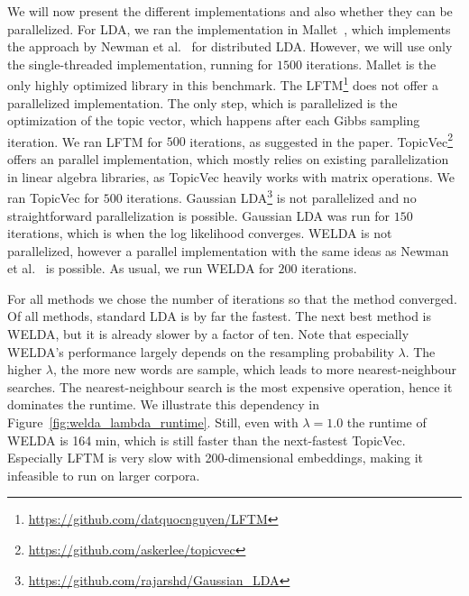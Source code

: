 \documentclass[
        a4paper,
        titlepage,
        twoside,
        parskip,
        numbers=noenddot
        ]{scrbook}
\theoremstyle{break}
\begin{document}
We will now present the different implementations and also whether they can be parallelized.
For LDA, we ran the implementation in Mallet~\cite{McCallum2002}, which implements the approach by Newman et al.~\cite{Newman2009} for distributed LDA.
However, we will use only the single-threaded implementation, running for $1500$ iterations.
Mallet is the only highly optimized library in this benchmark.
The LFTM\footnote{\url{https://github.com/datquocnguyen/LFTM}} does not offer a parallelized implementation.
The only step, which is parallelized is the optimization of the topic vector, which happens after each Gibbs sampling iteration.
We ran LFTM for $500$ iterations, as suggested in the paper.
TopicVec\footnote{\url{https://github.com/askerlee/topicvec}} offers an parallel implementation, which mostly relies on existing parallelization in linear algebra libraries, as TopicVec heavily works with matrix operations.
We ran TopicVec for $500$ iterations.
Gaussian LDA\footnote{\url{https://github.com/rajarshd/Gaussian_LDA}} is not parallelized and no straightforward parallelization is possible.
Gaussian LDA was run for $150$ iterations,  which is when the log likelihood converges.
WELDA is not parallelized, however a parallel implementation with the same ideas as Newman et al.~\cite{Newman2009} is possible.
As usual, we run WELDA for $200$ iterations.

For all methods we chose the number of iterations so that the method converged.
Of all methods, standard LDA is by far the fastest.
The next best method is WELDA, but it is already slower by a factor of ten.
Note that especially WELDA's performance largely depends on the resampling probability $\lambda$.
The higher $\lambda$, the more new words are sample, which leads to more nearest-neighbour searches.
The nearest-neighbour search is the most expensive operation, hence it dominates the runtime.
We illustrate this dependency in Figure~\ref{fig:welda_lambda_runtime}.
Still, even with $\lambda = 1.0$ the runtime of WELDA is 164 min, which is still faster than the next-fastest TopicVec.
Especially LFTM is very slow with 200-dimensional embeddings, making it infeasible to run on larger corpora.
\end{document}
